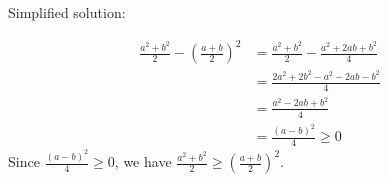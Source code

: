 \documentclass{article}
\begin{document}
Simplified solution:
\begin{tcolorbox}[colback=blue!10, width=\linewidth]
\begin{align*}
\frac{a^2+b^2}{2} - \left(\frac{a+b}{2}\right)^2 &= \frac{a^2+b^2}{2} - \frac{a^2+2ab+b^2}{4} \\
&= \frac{2a^2+2b^2 - a^2 - 2ab - b^2}{4} \\
&= \frac{a^2 - 2ab + b^2}{4} \\
&= \frac{(a-b)^2}{4} \geq 0
\end{align*} 
Since $\frac{(a-b)^2}{4} \ge 0$, we have $\frac{a^2+b^2}{2} \ge \left(\frac{a+b}{2}\right)^2$.
\end{tcolorbox}
\end{document}
